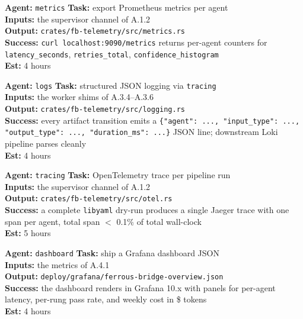 \documentclass[12pt]{article}
\theoremstyle{definition}
\theoremstyle{remark}
\newcommand{\libyaml}{\texttt{libyaml}}
\newenvironment{tasklist}{%
  \begingroup\raggedright
  \begin{description}[style=nextline, leftmargin=1.4cm, itemsep=0.4em]
}{%
  \end{description}
  \endgroup
}
\begin{document}
\begin{tasklist}
\item[\textbf{Task A.4.1}] \textbf{Agent:} \texttt{metrics} \quad
  \textbf{Task:} export Prometheus metrics per agent\\
  \textbf{Inputs:} the supervisor channel of A.1.2\\
  \textbf{Output:} \texttt{crates/fb-telemetry/src/metrics.rs}\\
  \textbf{Success:} \texttt{curl localhost:9090/metrics} returns
  per-agent counters for \texttt{latency\_seconds},
  \texttt{retries\_total}, \texttt{confidence\_histogram}\\
  \textbf{Est:} 4 hours

\item[\textbf{Task A.4.2}] \textbf{Agent:} \texttt{logs} \quad
  \textbf{Task:} structured JSON logging via \texttt{tracing}\\
  \textbf{Inputs:} the worker shims of A.3.4--A.3.6\\
  \textbf{Output:}
  \texttt{crates/fb-telemetry/src/logging.rs}\\
  \textbf{Success:} every artifact transition emits a
  \texttt{\{"agent": ..., "input\_type": ..., "output\_type": ..., "duration\_ms": ...\}}
  JSON line; downstream Loki pipeline parses cleanly\\
  \textbf{Est:} 4 hours

\item[\textbf{Task A.4.3}] \textbf{Agent:} \texttt{tracing} \quad
  \textbf{Task:} OpenTelemetry trace per pipeline run\\
  \textbf{Inputs:} the supervisor channel of A.1.2\\
  \textbf{Output:}
  \texttt{crates/fb-telemetry/src/otel.rs}\\
  \textbf{Success:} a complete \libyaml{} dry-run produces a single
  Jaeger trace with one span per agent, total span $<$ 0.1\% of total
  wall-clock\\
  \textbf{Est:} 5 hours

\item[\textbf{Task A.4.4}] \textbf{Agent:} \texttt{dashboard} \quad
  \textbf{Task:} ship a Grafana dashboard JSON\\
  \textbf{Inputs:} the metrics of A.4.1\\
  \textbf{Output:}
  \texttt{deploy/grafana/ferrous-bridge-overview.json}\\
  \textbf{Success:} the dashboard renders in Grafana 10.x with panels
  for per-agent latency, per-rung pass rate, and weekly cost in
  \$ tokens\\
  \textbf{Est:} 4 hours


\end{tasklist}
\end{document}
